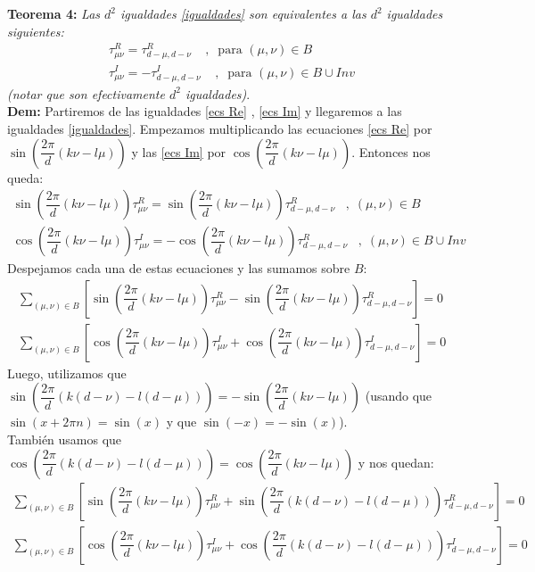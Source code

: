 \textbf{Teorema 4:} \textit{Las $d^2$ igualdades \ref{igualdades} son equivalentes a las $d^2$ igualdades siguientes:}
\begin{align}
\tau_{\mu \nu}^R = \tau_{d-\mu, d-\nu}^R \;\;\;\; ,\;\; \text{para $(\mu,\nu) \in B$}
\label{ecs Re} \\
\tau_{\mu \nu}^I = - \tau^I_{d-\mu, d-\nu} \;\;\;\;,\;\; \text{para $(\mu , \nu) \in B \cup Inv $}
\label{ecs Im}
\end{align}
\textit{(notar que son efectivamente $d^2$ igualdades)}. \\

\textbf{Dem:} Partiremos de las igualdades \ref{ecs Re} , \ref{ecs Im} y llegaremos a las igualdades \ref{igualdades}.
Empezamos multiplicando las ecuaciones \ref{ecs Re} por $\sin\left( \dfrac{2\pi}{d}(k\nu - l \mu)\right)$ 
y las \ref{ecs Im} por $\cos\left( \dfrac{2\pi}{d}(k\nu - l \mu)\right)$.
Entonces nos queda:
\begin{align*}
\sin\left( \dfrac{2\pi}{d}(k\nu - l \mu)\right) \tau_{\mu\nu}^R = \sin\left( \dfrac{2\pi}{d}(k\nu - l \mu)\right) \tau_{d-\mu, d-\nu}^R \;\;\; ,\; (\mu,\nu) \in B \\
\cos\left( \dfrac{2\pi}{d}(k\nu - l \mu)\right) \tau_{\mu\nu}^I = -\cos\left( \dfrac{2\pi}{d}(k\nu - l \mu)\right) \tau_{d-\mu, d-\nu}^R \;\;\; ,\; (\mu,\nu) \in B \cup Inv 
\end{align*}
Despejamos cada una de estas ecuaciones y las sumamos sobre $B$:
\begin{align*}
\sum_{(\mu,\nu) \in B} \left[  \sin\left( \dfrac{2\pi}{d}(k\nu - l \mu)\right) \tau_{\mu\nu}^R - \sin\left( \dfrac{2\pi}{d}(k\nu - l \mu)\right) \tau_{d-\mu, d-\nu}^R\right] = 0 \\
\sum_{(\mu,\nu) \in B}\left[ \cos\left( \dfrac{2\pi}{d}(k\nu - l \mu)\right) \tau_{\mu\nu}^I + \cos\left( \dfrac{2\pi}{d}(k\nu - l \mu)\right) \tau_{d-\mu, d-\nu}^I \right] = 0
\end{align*}
Luego, utilizamos que $\sin \left( \dfrac{2\pi}{d}(k(d-\nu) - l(d-\mu)) \right) = -\sin \left( \dfrac{2\pi}{d}(k\nu - l\mu) \right)$ (usando que $\sin(x + 2\pi n) = \sin(x)$ y que $\sin (-x) = -\sin(x)$). \\
También usamos que $\cos \left( \dfrac{2\pi}{d}(k(d-\nu) - l(d-\mu)) \right) = \cos \left( \dfrac{2\pi}{d}(k\nu - l\mu) \right)$ y nos quedan:
\begin{align*}
\sum_{(\mu,\nu) \in B}\left[  \sin\left( \dfrac{2\pi}{d}(k\nu - l \mu)\right) \tau_{\mu\nu}^R + \sin\left( \dfrac{2\pi}{d}(k(d-\nu) - l (d-\mu))\right) \tau_{d-\mu, d-\nu}^R \right] = 0 \\
\sum_{(\mu,\nu) \in B} \left[ \cos\left( \dfrac{2\pi}{d}(k\nu - l \mu)\right) \tau_{\mu\nu}^I + \cos\left( \dfrac{2\pi}{d}(k(d-\nu) - l (d-\mu))\right) \tau_{d-\mu, d-\nu}^I\right]  = 0
\end{align*}
